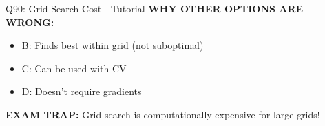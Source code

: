 \documentclass[8pt]{beamer}
\begin{document}
\begin{frame}{Q90: Grid Search Cost - Tutorial}
		\vspace{0.05cm}
		\textcolor{myred}{\textbf{WHY OTHER OPTIONS ARE WRONG:}}
		\begin{itemize}
			\item \textcolor{myred}{B:} Finds best within grid (not suboptimal)
			\item \textcolor{myred}{C:} Can be used with CV
			\item \textcolor{myred}{D:} Doesn't require gradients
		\end{itemize}
		
		\textcolor{myred}{\textbf{EXAM TRAP:}} Grid search is computationally expensive for large grids!
	\end{frame}
	
	
\end{document}
